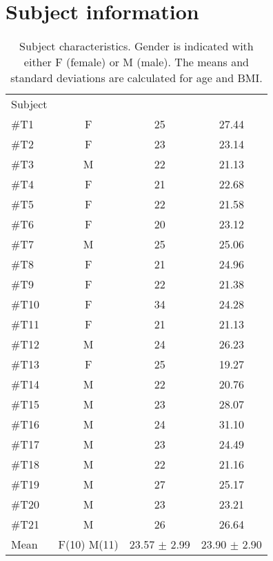 \chapter{Subject information} \label{SubjectINFO}

\begin{longtable}{l|c|c|c}
	\caption{Subject characteristics. Gender is indicated with either F (female) or M (male). The means and standard deviations are calculated for age and BMI.}
	\label{tab:subjectsA} \\
\cellcolor[HTML]{C0C0C0} {Subject} & 
\cellcolor[HTML]{C0C0C0}{Age} & \cellcolor[HTML]{C0C0C0}{Gender}  & \cellcolor[HTML]{C0C0C0}{BMI}  	\\  \rule{0pt}{3ex} 
\#T1 & F  & 25  & 27.44  \\ \hline \hline \rule{0pt}{3ex} 
\#T2 & F & 23 & 23.14  \\ \hline \hline \rule{0pt}{3ex} 
\#T3 & M & 22 & 21.13  \\ \hline \hline \rule{0pt}{3ex} 
\#T4 & F & 21  & 22.68  \\ \hline \hline \rule{0pt}{3ex} 
\#T5 & F & 22 & 21.58   \\ \hline \hline \rule{0pt}{3ex} 
\#T6 & F & 20 & 23.12 \\ \hline \hline \rule{0pt}{3ex} 
\#T7 & M & 25  & 25.06  \\ \hline \hline \rule{0pt}{3ex} 
	\#T8 & F & 21 & 24.96  \\ \hline \hline \rule{0pt}{3ex} 
	\#T9 & F & 22 & 21.38   \\ \hline \hline \rule{0pt}{3ex} 
	\#T10 & F & 34 & 24.28  \\ \hline \hline \rule{0pt}{3ex} 
	\#T11 & F & 21 & 21.13 \\ \hline \hline \rule{0pt}{3ex} 
\#T12 & M  & 24  & 26.23\\ \hline \hline \rule{0pt}{3ex} 
\#T13 &  F & 25 & 19.27 \\ \hline \hline \rule{0pt}{3ex} 
\#T14 & M  & 22 & 20.76  \\ \hline \hline \rule{0pt}{3ex} 
\#T15 & M & 23 & 28.07  \\ \hline \hline \rule{0pt}{3ex} 
\#T16 & M & 24 & 31.10 \\ \hline \hline \rule{0pt}{3ex} 
\#T17 & M & 23 & 24.49  \\ \hline \hline \rule{0pt}{3ex} 
	\#T18 & M & 22 & 21.16 \\ \hline \hline \rule{0pt}{3ex} 
	\#T19 & M & 27 & 25.17 \\ \hline \hline \rule{0pt}{3ex} 
	\#T20 & M & 23  & 23.21  \\ \hline \hline \rule{0pt}{3ex}
		\#T21 & M & 26 & 26.64   \\ \hline \hline \rule{0pt}{3ex} 
	Mean & F(10) M(11) & 23.57 $\pm$ 2.99  & 23.90 $\pm$ 2.90
	\\ \hline 
\end{longtable}
\vspace{-.5cm}


